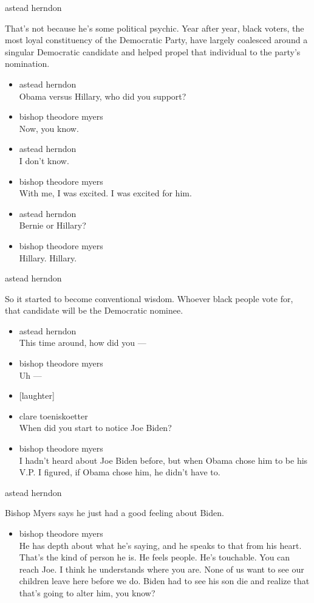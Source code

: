 astead herndon

That's not because he's some political psychic. Year after year, black
voters, the most loyal constituency of the Democratic Party, have
largely coalesced around a singular Democratic candidate and helped
propel that individual to the party's nomination.

\begin{itemize}
\item
  astead herndon\\
  Obama versus Hillary, who did you support?
\item
  bishop theodore myers\\
  Now, you know.
\item
  astead herndon\\
  I don't know.
\item
  bishop theodore myers\\
  With me, I was excited. I was excited for him.
\item
  astead herndon\\
  Bernie or Hillary?
\item
  bishop theodore myers\\
  Hillary. Hillary.
\end{itemize}

astead herndon

So it started to become conventional wisdom. Whoever black people vote
for, that candidate will be the Democratic nominee.

\begin{itemize}
\item
  astead herndon\\
  This time around, how did you ---
\item
  bishop theodore myers\\
  Uh ---
\item
  {[}laughter{]}
\item
  clare toeniskoetter\\
  When did you start to notice Joe Biden?
\item
  bishop theodore myers\\
  I hadn't heard about Joe Biden before, but when Obama chose him to be
  his V.P. I figured, if Obama chose him, he didn't have to.
\end{itemize}

astead herndon

Bishop Myers says he just had a good feeling about Biden.

\begin{itemize}
\tightlist
\item
  bishop theodore myers\\
  He has depth about what he's saying, and he speaks to that from his
  heart. That's the kind of person he is. He feels people. He's
  touchable. You can reach Joe. I think he understands where you are.
  None of us want to see our children leave here before we do. Biden had
  to see his son die and realize that that's going to alter him, you
  know?
\end{itemize}

